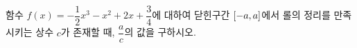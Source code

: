 함수 $f(x)=-\dfrac{1}{2}x^3-x^2+2x+\dfrac{3}{4}$에 대하여 닫힌구간 $[-a{,}\mkern3mu\mathopen{}a]$에서 롤의 정리를 만족시키는 상수 $c$가 존재할 때, $\dfrac{a}{c}$의 값을 구하시오. 
